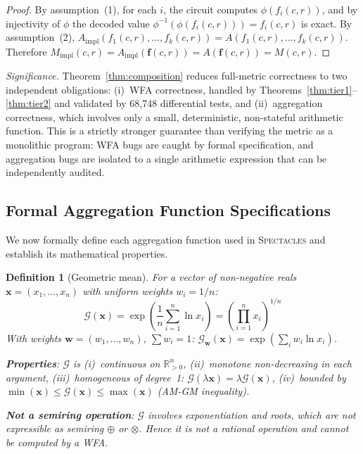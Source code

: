 \documentclass[11pt]{article}
\newtheorem{definition}[theorem]{Definition}
\newcommand{\spectacles}{\textsc{Spectacles}}
\newcommand{\R}{\mathbb{R}}
\begin{document}
\begin{proof}
By assumption~(1), for each $i$, the circuit computes
$\phi(f_i(c,r))$, and by injectivity of $\phi$ the decoded value
$\phi^{-1}(\phi(f_i(c,r))) = f_i(c,r)$ is exact.  By assumption~(2),
$A_{\mathrm{impl}}(f_1(c,r),\ldots,f_k(c,r)) = A(f_1(c,r),\ldots,f_k(c,r))$.
Therefore $M_{\mathrm{impl}}(c,r) = A_{\mathrm{impl}}(\mathbf{f}(c,r))
= A(\mathbf{f}(c,r)) = M(c,r)$.
\end{proof}

\noindent
\emph{Significance.}  Theorem~\ref{thm:composition} reduces full-metric
correctness to two independent obligations: (i)~WFA correctness, handled
by Theorems~\ref{thm:tier1}--\ref{thm:tier2} and validated by 68{,}748
differential tests, and (ii)~aggregation correctness, which involves
only a small, deterministic, non-stateful arithmetic function.  This is
a strictly stronger guarantee than verifying the metric as a monolithic
program: WFA bugs are caught by formal specification, and aggregation
bugs are isolated to a single arithmetic expression that can be
independently audited.

\subsection{Formal Aggregation Function Specifications}

We now formally define each aggregation function used in
\spectacles{} and establish its mathematical properties.

\begin{definition}[Geometric mean]\label{def:geomean}
For a vector of non-negative reals $\mathbf{x} = (x_1, \ldots, x_n)$
with uniform weights $w_i = 1/n$:
\[
\mathcal{G}(\mathbf{x}) = \exp\!\left(\frac{1}{n}\sum_{i=1}^{n} \ln x_i\right)
= \left(\prod_{i=1}^{n} x_i\right)^{1/n}
\]
With weights $\mathbf{w} = (w_1, \ldots, w_n)$, $\sum w_i = 1$:
$\mathcal{G}_\mathbf{w}(\mathbf{x}) = \exp(\sum_i w_i \ln x_i)$.

\textbf{Properties}: $\mathcal{G}$ is (i)~continuous on
$\R_{>0}^n$, (ii)~monotone non-decreasing in each argument,
(iii)~homogeneous of degree~1: $\mathcal{G}(\lambda\mathbf{x})
= \lambda \mathcal{G}(\mathbf{x})$, (iv)~bounded by
$\min(\mathbf{x}) \leq \mathcal{G}(\mathbf{x}) \leq \max(\mathbf{x})$
(AM-GM inequality).

\textbf{Not a semiring operation}: $\mathcal{G}$ involves
exponentiation and roots, which are not expressible as semiring
$\oplus$ or $\otimes$.  Hence it is not a rational operation and
cannot be computed by a WFA.
\end{definition}
\end{document}
